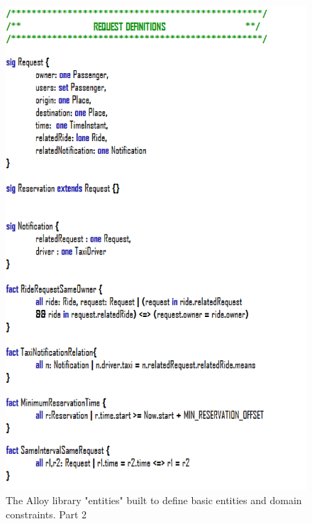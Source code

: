 \documentclass{article}
\begin{document}
\begin{figure}[h!]
        \centering
        \includegraphics[width=0.9\columnwidth]{alloy/entities2}
        \caption{The Alloy library "entities" built to define basic entities and domain constraints. Part 2}
        \label{fig:alloy-entities-2}
    \end{figure}
    
\end{document}
